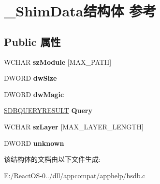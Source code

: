 \hypertarget{struct___shim_data}{}\section{\+\_\+\+Shim\+Data结构体 参考}
\label{struct___shim_data}
\subsection*{Public 属性}
\begin{DoxyCompactItemize}
\item 
\mbox{\label{struct___shim_data_a1882140c1e83c6182481589fb2be131b}} 
W\+C\+H\+AR {\bfseries sz\+Module} \mbox{[}M\+A\+X\+\_\+\+P\+A\+TH\mbox{]}
\item 
\mbox{\label{struct___shim_data_aab415ff8904edf3f776f0526967b7862}} 
D\+W\+O\+RD {\bfseries dw\+Size}
\item 
\mbox{\label{struct___shim_data_aff74a1e0140f10f86898875bf22bda4a}} 
D\+W\+O\+RD {\bfseries dw\+Magic}
\item 
\mbox{\label{struct___shim_data_a656b0697eb650c9ff545300e6320731d}} 
\hyperlink{structtag_s_d_b_q_u_e_r_y_r_e_s_u_l_t}{S\+D\+B\+Q\+U\+E\+R\+Y\+R\+E\+S\+U\+LT} {\bfseries Query}
\item 
\mbox{\label{struct___shim_data_a7e1b92fbd67add2797de77b01d4de608}} 
W\+C\+H\+AR {\bfseries sz\+Layer} \mbox{[}M\+A\+X\+\_\+\+L\+A\+Y\+E\+R\+\_\+\+L\+E\+N\+G\+TH\mbox{]}
\item 
\mbox{\label{struct___shim_data_a800c639821adcc531cb502fa79c38393}} 
D\+W\+O\+RD {\bfseries unknown}
\end{DoxyCompactItemize}


该结构体的文档由以下文件生成\+:\begin{DoxyCompactItemize}
\item 
E\+:/\+React\+O\+S-\/0../dll/appcompat/apphelp/hsdb.\+c\end{DoxyCompactItemize}
